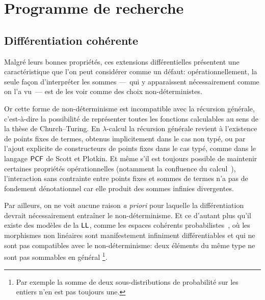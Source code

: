 \documentclass[a4]{article}
\begin{document}




\section*{Programme de recherche}

\subsection*{Différentiation cohérente}
Malgré leurs bonnes propriétés, ces extensions différentielles
présentent une caractéristique que l'on peut considérer comme un
défaut: opérationnellement, la seule façon d'interpréter les sommes
---~qui y apparaissent nécessairement comme on l'a vu~--- est de les
voir comme des choix non-déterministes.

Or cette forme de non-déterminisme est incompatible avec la récursion gé\-né\-ra\-le,
c’est-à-dire la possibilité de représenter toutes les fonctions calculables au
sens de la thèse de Church--Turing.
%
En $\lambda$-calcul la récursion générale revient à l’existence de points fixes
de termes, obtenus implicitement dans le cas non typé, ou par l’ajout explicite
de constructeurs de points fixes dans le cas typé, comme dans le langage $\mathsf{PCF}$
de Scott et Plotkin.
%
Et même s’il est toujours possible de maintenir certaines propriétés
opérationnelles (notamment la confluence du calcul~\cite{Vaux09}),
l’interaction sans contrainte entre points fixes et sommes de termes n’a pas de
fondement dénotationnel car elle produit des sommes infinies divergentes.

Par ailleurs, on ne voit aucune raison \emph{a priori} pour laquelle la
différentiation devrait nécessairement entraîner le non-déterminisme.
%
Et ce d'autant plus qu'il existe des modèles de la $\hbox{\textsf{LL}}$, comme les
espaces cohérents probabilistes~\cite{DanosEhrhard08}, où les morphismes non
linéaires sont manifestement infiniment différentiables et qui ne sont pas
compatibles avec le non-déterminisme: deux éléments du même type ne
sont pas sommables en général%
\footnote{Par exemple la somme de deux sous-distributions de probabilité sur
  les entiers n'en est pas toujours une.}.
\end{document}
